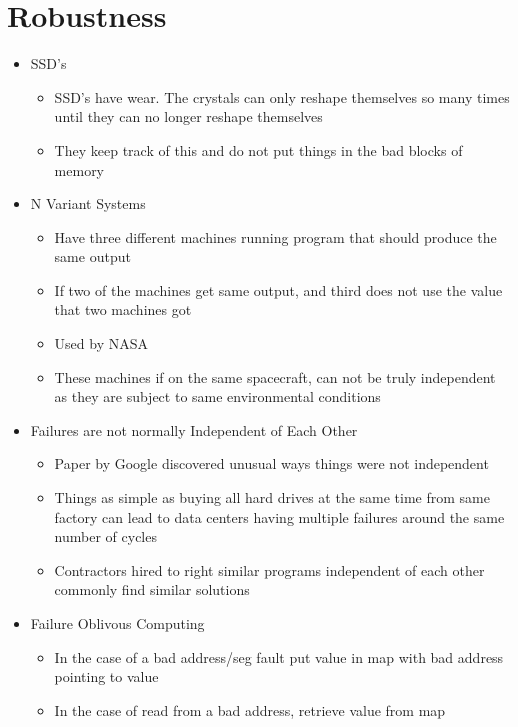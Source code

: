 \documentclass[twoside]{article}
\begin{document}
\section{Robustness}
\begin{itemize}
    \item SSD's
    \begin{itemize}
        \item SSD's have wear. The crystals can only reshape themselves so many times until they can no longer reshape themselves
        \item They keep track of this and do not put things in the bad blocks of memory
    \end{itemize}
    \item N Variant Systems
    \begin{itemize}
        \item Have three different machines running program that should produce the same output
        \item If two of the machines get same output, and third does not use the value that two machines got
        \item Used by NASA

        \item These machines if on the same spacecraft, can not be truly independent as they are subject to same environmental conditions
    \end{itemize}
    \item Failures are not normally Independent of Each Other
    \begin{itemize}
        \item Paper by Google discovered unusual ways things were not independent
        \item Things as simple as buying all hard drives at the same time from same factory can lead to data centers having multiple failures around the same number of cycles
        \item Contractors hired to right similar programs independent of each other commonly find similar solutions
        
    \end{itemize}
    \item Failure Oblivous Computing
    \begin{itemize}
        \item In the case of a bad address/seg fault put value in map with bad address pointing to value
        \item In the case of read from a bad address, retrieve value from map
    \end{itemize}
\end{itemize}
\end{document}
